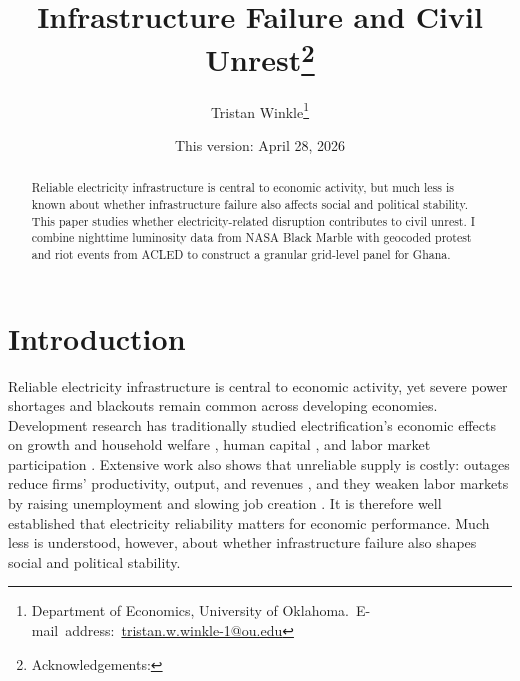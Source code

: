 \documentclass[12pt]{article}
\begin{document}
\begin{singlespace}
\title{Infrastructure Failure and Civil Unrest\thanks{Acknowledgements:}}
\end{singlespace}

\author{Tristan Winkle\thanks{Department of Economics, University of Oklahoma.\
E-mail~address:~\href{mailto:student.name@ou.edu}{tristan.w.winkle-1@ou.edu}}}

\date{This version: April 28, 2026}

\maketitle

\begin{abstract}
\begin{singlespace}
\noindent Reliable electricity infrastructure is central to economic activity, but much less is known about whether infrastructure failure also affects social and political stability. This paper studies whether electricity-related disruption contributes to civil unrest. I combine nighttime luminosity data from NASA Black Marble with geocoded protest and riot events from ACLED to construct a granular grid-level panel for Ghana.
\end{singlespace}

\end{abstract}
\vfill{}

\pagebreak{}

\section{Introduction}\label{sec:intro}

Reliable electricity infrastructure is central to economic activity, yet severe power shortages and blackouts remain common across developing economies. Development research has traditionally studied electrification’s economic effects on growth and household welfare \citep{lee2020householdelectrification}, human capital \citep{lipscomb2013electrificationbrazil, abbasi2022roadselectricityjobs}, and labor market participation \citep{dinkelman2011ruralelectrification}. Extensive work also shows that unreliable supply is costly: outages reduce firms’ productivity, output, and revenues \citep{allcott2016electricityindia, cole2018poweroutagesfirms, abeberese2021electricityghana}, and they weaken labor markets by raising unemployment and slowing job creation \citep{mensah2024electricityjobs}. It is therefore well established that electricity reliability matters for economic performance. Much less is understood, however, about whether infrastructure failure also shapes social and political stability.
\end{document}
